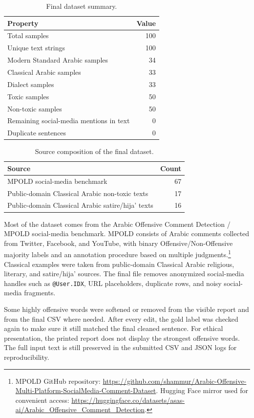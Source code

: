 \begin{table}[H]
\centering
\caption{Final dataset summary.}
\begin{tabular}{lr}
\toprule
Property & Value \\
\midrule
Total samples & 100 \\
Unique text strings & 100 \\
Modern Standard Arabic samples & 34 \\
Classical Arabic samples & 33 \\
Dialect samples & 33 \\
Toxic samples & 50 \\
Non-toxic samples & 50 \\
Remaining social-media mentions in text & 0 \\
Duplicate sentences & 0 \\
\bottomrule
\end{tabular}
\end{table}

\begin{table}[H]
\centering
\caption{Source composition of the final dataset.}
\begin{tabular}{lr}
\toprule
Source & Count \\
\midrule
MPOLD social-media benchmark & 67 \\
Public-domain Classical Arabic non-toxic texts & 17 \\
Public-domain Classical Arabic satire/hija' texts & 16 \\
\bottomrule
\end{tabular}
\end{table}

Most of the dataset comes from the Arabic Offensive Comment Detection / MPOLD social-media benchmark. MPOLD consists of Arabic comments collected from Twitter, Facebook, and YouTube, with binary Offensive/Non-Offensive majority labels and an annotation procedure based on multiple judgments.\footnote{MPOLD GitHub repository: \url{https://github.com/shammur/Arabic-Offensive-Multi-Platform-SocialMedia-Comment-Dataset}. Hugging Face mirror used for convenient access: \url{https://huggingface.co/datasets/asas-ai/Arabic_Offensive_Comment_Detection}.} Classical examples were taken from public-domain Classical Arabic religious, literary, and satire/hija' sources. The final file removes anonymized social-media handles such as \texttt{@User.IDX}, URL placeholders, duplicate rows, and noisy social-media fragments.

Some highly offensive words were softened or removed from the visible report and from the final CSV where needed. After every edit, the gold label was checked again to make sure it still matched the final cleaned sentence. For ethical presentation, the printed report does not display the strongest offensive words. The full input text is still preserved in the submitted CSV and JSON logs for reproducibility.


